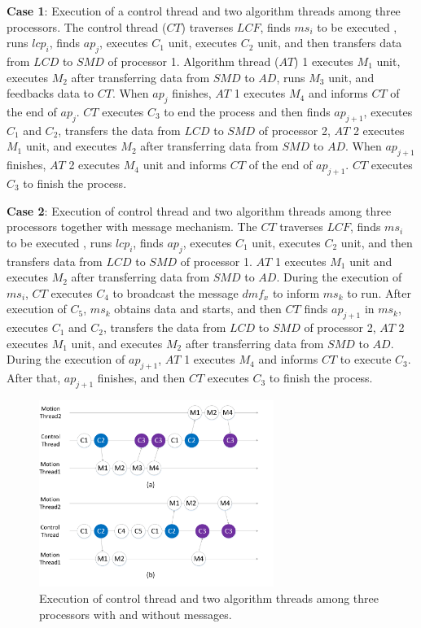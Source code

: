 \documentclass[journal,UTF8]{IEEEtran}
\begin{document}
\textbf{Case 1}: Execution of a control thread and two algorithm threads among three processors. The control thread ($CT$) traverses $LCF$, finds $ms_i$ to be executed , runs $lcp_i$, finds $ap_j$, executes $C_1$ unit, executes $C_2$ unit, and then transfers data from $LCD$ to $SMD$ of processor 1. Algorithm thread ($AT$) 1 executes $M_1$ unit, executes $M_2$ after transferring data from $SMD$ to $AD$, runs $M_3$ unit, and feedbacks data to $CT$. When $ap_j$ finishes, $AT$ 1 executes $M_4$ and informs $CT$ of the end of $ap_j$. $CT$ executes $C_3$ to end the process and then finds $ap_{j+1}$, executes $C_1$ and $C_2$, transfers the data from $LCD$ to $SMD$ of processor 2, $AT$ 2 executes $M_1$ unit, and executes $M_2$ after transferring data from $SMD$ to $AD$. When $ap_{j+1}$ finishes, $AT$ 2 executes $M_4$ unit and informs $CT$ of the end of $ap_{j+1}$. $CT$ executes $C_3$ to finish the process.
  
\textbf{Case 2}: Execution of control thread and two algorithm threads among three processors together with message mechanism. The $CT$ traverses $LCF$, finds $ms_i$ to be executed , runs $lcp_i$, finds $ap_j$, executes $C_1$ unit, executes $C_2$ unit, and then transfers data from $LCD$ to $SMD$ of processor 1. $AT$ 1 executes $M_1$ unit and executes $M_2$ after transferring data from $SMD$ to $AD$. During the execution of $ms_i$, $CT$ executes $C_4$ to broadcast the message $dmf_x$ to inform $ms_{k}$ to run. After execution of $C_5$, $ms_{k}$ obtains data and starts, and then $CT$ finds $ap_{j+1}$ in $ms_{k}$, executes $C_1$ and $C_2$, transfers the data from $LCD$ to $SMD$ of processor 2, $AT$ 2 executes $M_1$ unit, and executes $M_2$ after transferring data from $SMD$ to $AD$. During the execution of $ap_{j+1}$, $AT$ 1 executes $M_4$ and informs $CT$ to execute $C_3$. After that, $ap_{j+1}$ finishes, and then $CT$ executes $C_3$ to finish the process.
  

  
  \begin{figure}
  	\centering
  	\includegraphics[width=3in]{fig/threadFlow.pdf}
  	\caption{ Execution of control thread and two algorithm threads among three processors with and without messages.}
  	\label{fig:threadFlow}
  \end{figure}
\end{document}
